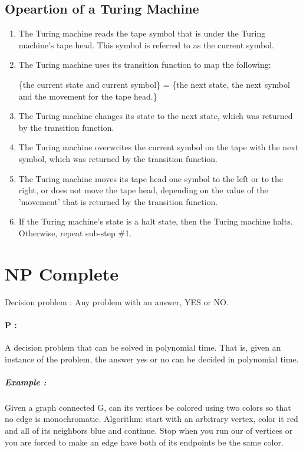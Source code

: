 \documentclass[12pt]{article}
\begin{document}
\subsection{Opeartion of a Turing Machine}
\begin{enumerate}
\item The Turing machine reads the tape symbol that is under the Turing machine's tape head. This symbol is referred to as the current symbol.
\item The Turing machine uses its transition function to map the following: 
\begin{center}
\{the current state and current symbol\} =  \{the next state, the next symbol and the movement for the tape head.\}
\end{center}
\item The Turing machine changes its state to the next state, which was returned by the transition function.
\item The Turing machine overwrites the current symbol on the tape with the next symbol, which was returned by the transition function.
\item The Turing machine moves its tape head one symbol to the left or to the right, or does not move the tape head, depending on the value of the 'movement' that is returned by the transition function.
\item If the Turing machine's state is a halt state, then the Turing machine halts. Otherwise, repeat sub-step \#1.
\end{enumerate}

\section{NP Complete}
Decision problem :
Any problem with an answer, YES or NO.

\paragraph{P :} A decision problem that can be solved in polynomial time. That is, given an instance of the problem, the answer yes or no can be decided in polynomial time.

\subparagraph{\textit{Example : }} Given a graph connected G, can its vertices be colored using two colors so that no edge is monochromatic. Algorithm: start with an arbitrary vertex, color it red and all of its neighbors blue and continue. Stop when you run our of vertices or you are forced to make an edge have both of its endpoints be the same color.
\end{document}
